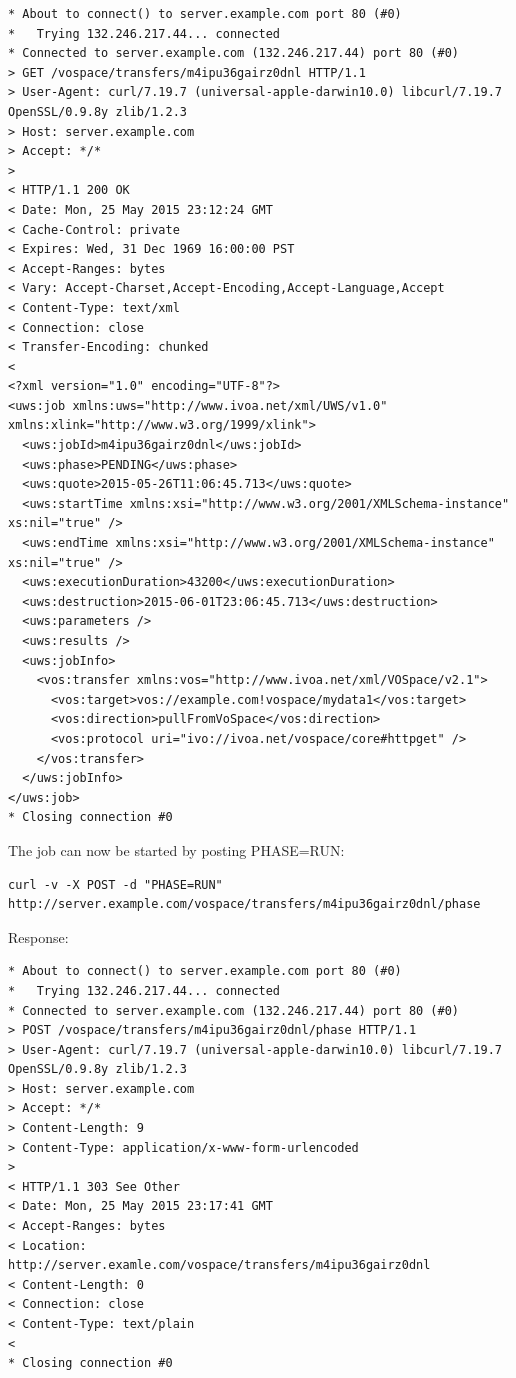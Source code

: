 \documentclass[11pt,a4paper]{ivoa}
\begin{document}
\begin{lstlisting}
* About to connect() to server.example.com port 80 (#0)
*   Trying 132.246.217.44... connected
* Connected to server.example.com (132.246.217.44) port 80 (#0)
> GET /vospace/transfers/m4ipu36gairz0dnl HTTP/1.1
> User-Agent: curl/7.19.7 (universal-apple-darwin10.0) libcurl/7.19.7 OpenSSL/0.9.8y zlib/1.2.3
> Host: server.example.com
> Accept: */*
>
< HTTP/1.1 200 OK
< Date: Mon, 25 May 2015 23:12:24 GMT
< Cache-Control: private
< Expires: Wed, 31 Dec 1969 16:00:00 PST
< Accept-Ranges: bytes
< Vary: Accept-Charset,Accept-Encoding,Accept-Language,Accept
< Content-Type: text/xml
< Connection: close
< Transfer-Encoding: chunked
<
<?xml version="1.0" encoding="UTF-8"?>
<uws:job xmlns:uws="http://www.ivoa.net/xml/UWS/v1.0" xmlns:xlink="http://www.w3.org/1999/xlink">
  <uws:jobId>m4ipu36gairz0dnl</uws:jobId>
  <uws:phase>PENDING</uws:phase>
  <uws:quote>2015-05-26T11:06:45.713</uws:quote>
  <uws:startTime xmlns:xsi="http://www.w3.org/2001/XMLSchema-instance" xs:nil="true" />
  <uws:endTime xmlns:xsi="http://www.w3.org/2001/XMLSchema-instance" xs:nil="true" />
  <uws:executionDuration>43200</uws:executionDuration>
  <uws:destruction>2015-06-01T23:06:45.713</uws:destruction>
  <uws:parameters />
  <uws:results />
  <uws:jobInfo>
    <vos:transfer xmlns:vos="http://www.ivoa.net/xml/VOSpace/v2.1">
      <vos:target>vos://example.com!vospace/mydata1</vos:target>
      <vos:direction>pullFromVoSpace</vos:direction>
      <vos:protocol uri="ivo://ivoa.net/vospace/core#httpget" />
    </vos:transfer>
  </uws:jobInfo>
</uws:job>
* Closing connection #0
\end{lstlisting}
The job can now be started by posting PHASE=RUN:
\begin{lstlisting}
curl -v -X POST -d "PHASE=RUN" http://server.example.com/vospace/transfers/m4ipu36gairz0dnl/phase
\end{lstlisting}
Response:
\begin{lstlisting}
* About to connect() to server.example.com port 80 (#0)
*   Trying 132.246.217.44... connected
* Connected to server.example.com (132.246.217.44) port 80 (#0)
> POST /vospace/transfers/m4ipu36gairz0dnl/phase HTTP/1.1
> User-Agent: curl/7.19.7 (universal-apple-darwin10.0) libcurl/7.19.7 OpenSSL/0.9.8y zlib/1.2.3
> Host: server.example.com
> Accept: */*
> Content-Length: 9
> Content-Type: application/x-www-form-urlencoded
>
< HTTP/1.1 303 See Other
< Date: Mon, 25 May 2015 23:17:41 GMT
< Accept-Ranges: bytes
< Location: http://server.examle.com/vospace/transfers/m4ipu36gairz0dnl
< Content-Length: 0
< Connection: close
< Content-Type: text/plain
<
* Closing connection #0
\end{lstlisting}
\end{document}
